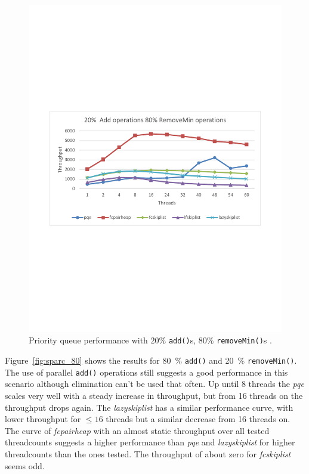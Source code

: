 \begin{figure}[htb]
\begin{minipage}[b]{.495\textwidth}
		\includegraphics[width=\linewidth]{graphics/sparc-20-80.pdf}
		\caption{Priority queue performance with 20\% \texttt{add()}s, 80\% \texttt{removeMin()}s \cite{calciu_adaptive_2014}.}
		\label{fig:sparc_20}
	\end{minipage}
\end{figure}

Figure~\ref{fig:sparc_80} shows the results for 80~\% \texttt{add()} and 20~\% \texttt{removeMin()}. The use of parallel \texttt{add()} operations still suggests a good performance in this scenario although elimination can't be used that often. Up until 8 threads the \textit{pqe} scales very well with a steady increase in throughput, but from 16 threads on the throughput drops again. The \textit{lazyskiplist} has a similar performance curve, with lower throughput for $\le 16$ threads but a similar decrease from 16 threads on. The curve of \textit{fcpairheap} with an almost static throughput over all tested threadcounts suggests a higher performance than \textit{pqe} and \textit{lazyskiplist} for higher threadcounts than the ones tested. The throughput of about zero for \textit{fcskiplist} seems odd.

